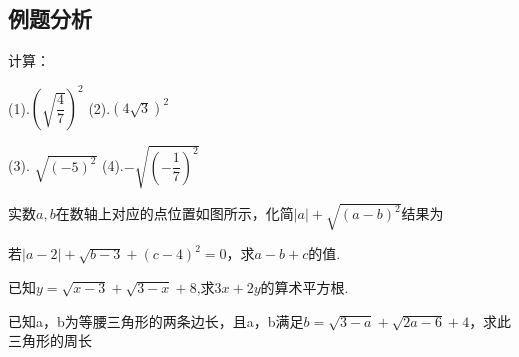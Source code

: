    \subsection{例题分析}
      \begin{example}   
            计算：\par
            (1).$(\sqrt{\dfrac{4}{7}})^2$   \hfil (2).$(4\sqrt{3})^2$\par 
            \vspace{2cm}
            (3). $\sqrt{(-5)^2}$ \hfil  (4).$-\sqrt{(-\dfrac{1}{7})^2}$ 
            \vspace{2cm}  
      \end{example} 
      \begin{example}
          实数$a,b$在数轴上对应的点位置如图所示，化简$|a|+\sqrt{(a-b)^2}$结果为\par
       
             
         \begin{figure}[h]
            \centering
             
       
          \caption{\label{fig: } }
        \end{figure}
      \end{example}
      
            \begin{example}
        若$|a-2|+\sqrt{b-3}+(c-4)^{2}=0$，求$a-b+c$的值.
      \end{example}
      \vspace{2cm}
      
      \begin{example}
        已知$y=\sqrt{x-3}+\sqrt{3-x}+8$,求$3 x+2 y$的算术平方根.
      \end{example}
      \vspace{2cm}
      \begin{example}
        已知a，b为等腰三角形的两条边长，且a，b满足$b=\sqrt{3-a}+\sqrt{2 a-6}+4$，求此三角形的周长
      \end{example}
      \vspace{1.7cm}
